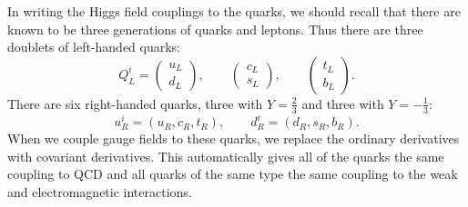 In writing the Higgs field couplings to the quarks, we should recall that
there are known to be three generations of quarks and leptons.  Thus there
are three doublets of left-handed quarks:
\begin{equation}
  Q^i_L = \begin{pmatrix}u_L\\ d_L\end{pmatrix},\qquad
  \begin{pmatrix}c_L\\ s_L\end{pmatrix},\qquad
  \begin{pmatrix}t_L\\ b_L\end{pmatrix} .
  \label{eq:20.131}
\end{equation}
There are six right-handed quarks, three with $Y = \frac{2}{3}$ and three
with $Y = -\frac{1}{3}$:
\begin{equation}
  u^i_R = (u_R, c_R, t_R),\qquad
  d^i_R = (d_R, s_R, b_R) .
  \label{eq:20.132}
\end{equation}
When we couple gauge fields to these quarks, we replace the ordinary
derivatives with covariant derivatives.  This automatically gives all of the
quarks the same coupling to QCD and all quarks of the same type the same
coupling to the weak and electromagnetic interactions.

